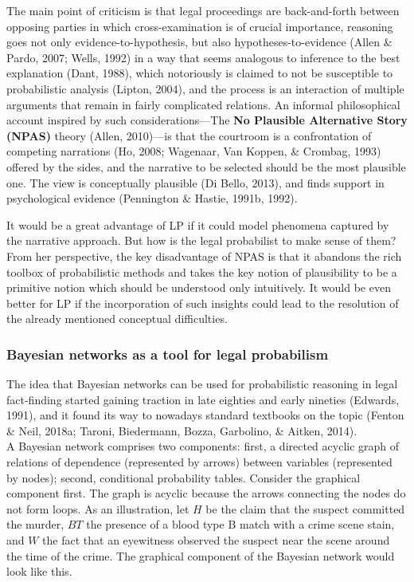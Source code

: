 \documentclass[11pt,dvipsnames,enabledeprecatedfontcommands]{scrartcl}
\begin{document}
The main point of criticism is that legal proceedings are back-and-forth
between opposing parties in which cross-examination is of crucial
importance, reasoning goes not only evidence-to-hypothesis, but also
hypotheses-to-evidence (Allen \& Pardo, 2007; Wells, 1992) in a way that
seems analogous to inference to the best explanation (Dant, 1988), which
notoriously is claimed to not be susceptible to probabilistic analysis
(Lipton, 2004), and the process is an interaction of multiple arguments
that remain in fairly complicated relations. An informal philosophical
account inspired by such considerations---The
\textbf{No Plausible Alternative Story (NPAS)} theory (Allen, 2010)---is
that the courtroom is a confrontation of competing narrations (Ho, 2008;
Wagenaar, Van Koppen, \& Crombag, 1993) offered by the sides, and the
narrative to be selected should be the most plausible one. The view is
conceptually plausible (Di Bello, 2013), and finds support in
psychological evidence (Pennington \& Hastie, 1991b, 1992).

It would be a great advantage of LP if it could model phenomena captured
by the narrative approach. But how is the legal probabilist to make
sense of them? From her perspective, the key disadvantage of NPAS is
that it abandons the rich toolbox of probabilistic methods and takes the
key notion of plausibility to be a primitive notion which should be
understood only intuitively. It would be even better for LP if the
incorporation of such insights could lead to the resolution of the
already mentioned conceptual difficulties.

\hypertarget{bayesian-networks-as-a-tool-for-legal-probabilism}{%
\subsubsection{Bayesian networks as a tool for legal
probabilism}\label{bayesian-networks-as-a-tool-for-legal-probabilism}}

The idea that Bayesian networks can be used for probabilistic reasoning
in legal fact-finding started gaining traction in late eighties and
early nineties (Edwards, 1991), and it found its way to nowadays
standard textbooks on the topic (Fenton \& Neil, 2018a; Taroni,
Biedermann, Bozza, Garbolino, \& Aitken, 2014).\\
A Bayesian network comprises two components: first, a directed acyclic
graph of relations of dependence (represented by arrows) between
variables (represented by nodes); second, conditional probability
tables. Consider the graphical component first. The graph is acyclic
because the arrows connecting the nodes do not form loops. As an
illustration, let \(H\) be the claim that the suspect committed the
murder, \(BT\) the presence of a blood type B match with a crime scene
stain, and \(W\) the fact that an eyewitness observed the suspect near
the scene around the time of the crime. The graphical component of the
Bayesian network would look like this.
\end{document}
